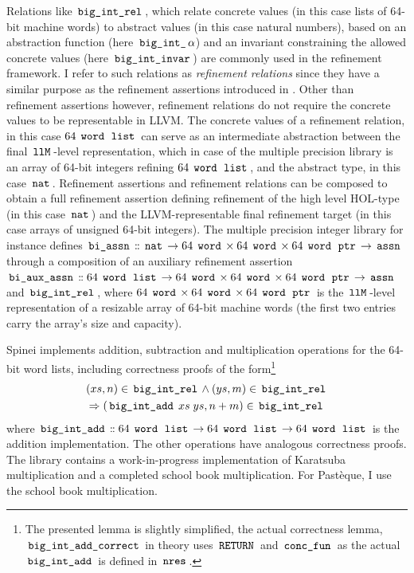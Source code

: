 Relations like $\,\text{\ttfamily big\_int\_rel}\,$, which relate concrete values (in this case lists of 64-bit machine words) to abstract values (in this case natural numbers), based on an abstraction function (here $\,\text{\ttfamily big\_int\_}\,\alpha$) and an invariant constraining the allowed concrete values (here $\,\text{\ttfamily big\_int\_invar}\,$) are commonly used in the refinement framework.
I refer to such relations as \textit{refinement relations} since they have a similar purpose as the refinement assertions introduced in .
Other than refinement assertions however, refinement relations do not require the concrete values to be representable in LLVM.
The concrete values of a refinement relation, in this case $64 \; \,\text{\ttfamily word}\, \; \,\text{\ttfamily list}\,$ can serve as an intermediate abstraction between the final $\,\text{\ttfamily llM}\,$-level representation, which in case of the multiple precision library is an array of 64-bit integers refining $64 \; \,\text{\ttfamily word}\, \; \,\text{\ttfamily list}\,$, and the abstract type, in this case $\,\text{\ttfamily nat}\,$.
Refinement assertions and refinement relations can be composed to obtain a full refinement assertion defining refinement of the high level HOL-type (in this case $\,\text{\ttfamily nat}\,$) and the LLVM-representable final refinement target (in this case arrays of unsigned 64-bit integers).
The multiple precision integer library for instance defines $\,\text{\ttfamily bi\_assn}\, \mathrel{\mathord{:}\mkern-1.2mu\mathord{:}} \,\text{\ttfamily nat}\, \rightarrow 64 \; \,\text{\ttfamily word}\, \times 64 \; \,\text{\ttfamily word}\, \times 64 \; \,\text{\ttfamily word}\, \; \,\text{\ttfamily ptr}\, \rightarrow \,\text{\ttfamily assn}\,$ through a composition of an auxiliary refinement assertion $\,\text{\ttfamily bi\_aux\_assn}\, \mathrel{\mathord{:}\mkern-1.2mu\mathord{:}} 64 \; \,\text{\ttfamily word}\, \; \,\text{\ttfamily list}\, \rightarrow 64 \; \,\text{\ttfamily word}\, \times 64 \; \,\text{\ttfamily word}\, \times 64 \; \,\text{\ttfamily word}\, \; \,\text{\ttfamily ptr}\, \rightarrow \,\text{\ttfamily assn}\,$ and $\,\text{\ttfamily big\_int\_rel}\,$, where $64 \; \,\text{\ttfamily word}\, \times 64 \; \,\text{\ttfamily word}\, \times 64 \; \,\text{\ttfamily word}\, \; \,\text{\ttfamily ptr}\,$ is the $\,\text{\ttfamily llM}\,$-level representation of a resizable array of 64-bit machine words (the first two entries carry the array's size and capacity).

Spinei implements addition, subtraction and multiplication operations for the 64-bit word lists, including correctness proofs of the form\footnote{
    The presented lemma is slightly simplified, the actual correctness lemma, $\,\text{\ttfamily big\_int\_add\_correct}\,$ in theory  uses $\,\text{\ttfamily RETURN}\,$ and $\,\text{\ttfamily conc\_fun}\,$ as the actual $\,\text{\ttfamily big\_int\_add}\,$ is defined in $\,\text{\ttfamily nres}\,$.
}
\begin{gather*}
	(xs,n) \in \,\text{\ttfamily big\_int\_rel}\, \land (ys,m) \in \,\text{\ttfamily big\_int\_rel}\, \\
	\Rightarrow (\,\text{\ttfamily big\_int\_add}\, \; xs \; ys, n + m) \in \,\text{\ttfamily big\_int\_rel}\,
\end{gather*}
where $\,\text{\ttfamily big\_int\_add}\, \mathrel{\mathord{:}\mkern-1.2mu\mathord{:}} 64 \; \,\text{\ttfamily word}\, \; \,\text{\ttfamily list}\, \rightarrow 64 \; \,\text{\ttfamily word}\, \; \,\text{\ttfamily list}\, \rightarrow 64 \; \,\text{\ttfamily word}\, \; \,\text{\ttfamily list}\,$ is the addition implementation.
The other operations have analogous correctness proofs.
The library contains a work-in-progress implementation of Karatsuba multiplication \cite{karatsuba} and a completed school book multiplication.
For Pastèque, I use the school book multiplication.

